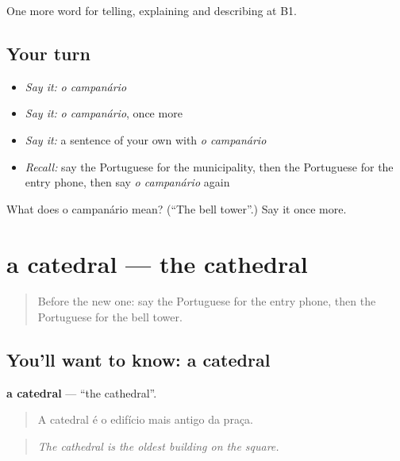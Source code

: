 \begin{grammarlens}[title={What you've built}]
One more word for telling, explaining and describing at B1.
\end{grammarlens}

\subsection*{Your turn}
\begin{itemize}
\raggedright
  \item \emph{Say it:} \emph{o campanário}
  \item \emph{Say it:} \emph{o campanário}, once more
  \item \emph{Say it:} a sentence of your own with \emph{o campanário}
  \item \emph{Recall:} say the Portuguese for the municipality, then the Portuguese for the entry phone, then say \emph{o campanário} again
\end{itemize}

\begin{tcolorbox}[breakable,colback=teal!4,colframe=teal!35!black,title={Before you move on}]
What does o campanário mean? (\textquotedblleft{}The bell tower\textquotedblright{}.) Say it once more.
\end{tcolorbox}
\section[a catedral]{a catedral — the cathedral}

\label{lesson:PT-C441-catedral}



\begin{quote}
Before the new one: say the Portuguese for the entry phone, then the Portuguese for the bell tower.
\end{quote}

\subsection*{You'll want to know: a catedral}
\textbf{a catedral} — \textquotedblleft{}the cathedral\textquotedblright{}.

\begin{quote}
A catedral é o edifício mais antigo da praça.
\end{quote}

\begin{quote}
\emph{The cathedral is the oldest building on the square.}
\end{quote}

